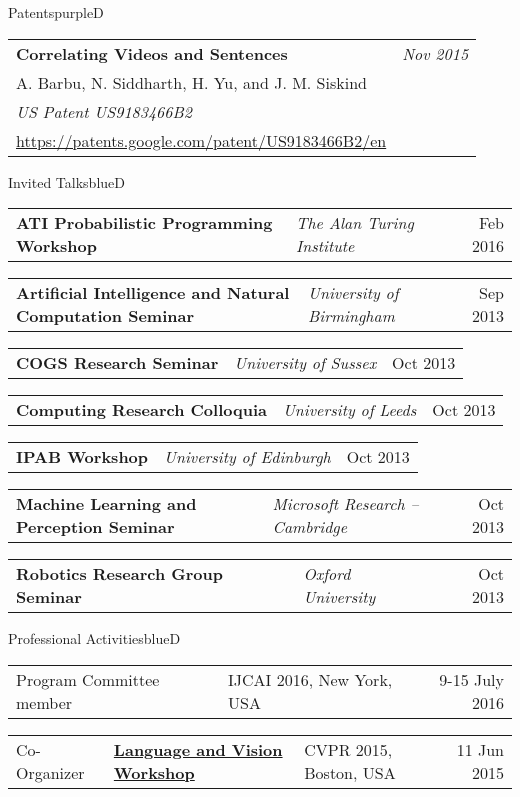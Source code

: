 \documentclass[a4paper]{article}
\makeatletter
\newlength{\itemtextwidth}
\newenvironment{publication}[5]
{ \item
  \begin{tabular*}{\itemtextwidth}{@{}p{5.6in}@{\extracolsep{\fill}}r@{}}
    \textbf{#1} & \textit{#2}\\ #3 &\\ \textit{#4}&\\ #5
  \end{tabular*}
  \vspace*{-2pt}
} {}
\newenvironment{talk}[3]
{ \item
  \begin{tabular*}{\itemtextwidth}{@{}l@{\hspace*{2ex}}l@{\extracolsep{\fill}}r@{}}
    \textbf{#1} & \textit{#2} & #3
  \end{tabular*}
  \vspace*{-2pt}
} {}
\newenvironment{workshop}[5]
{ \item
  \begin{tabular*}{\itemtextwidth}{@{}ll@{\hspace*{1ex}}l@{\extracolsep{\fill}}r@{}}
    #1 & \href{#3}{\textbf{#2}} & {\small #4} & #5
  \end{tabular*}
  \vspace*{-2pt}
} {}
\def\item{\addtocounter{enumi}{-2}\oldItem}
\makeatother
\begin{document}
\begin{region}[P][1]{Patents}{purpleD}
  \begin{publication} {Correlating Videos and Sentences}
    {Nov 2015}                  %
    {A. Barbu, N. Siddharth, H. Yu, and J. M. Siskind}
    {US Patent US9183466B2}
    {\url{https://patents.google.com/patent/US9183466B2/en}}
  \end{publication}
\end{region}

\begin{region}{Invited Talks}{blueD}
  \begin{talk} {ATI Probabilistic Programming Workshop}
    {The Alan Turing Institute}
    {Feb 2016}
  \end{talk}
  \begin{talk} {Artificial Intelligence and Natural Computation Seminar}
    {University of Birmingham}
    {Sep 2013}
  \end{talk}
  \begin{talk}{COGS Research Seminar}
    {University of Sussex}
    {Oct 2013}
  \end{talk}
  \begin{talk} {Computing Research Colloquia}
    {University of Leeds}
    {Oct 2013}
  \end{talk}
  \begin{talk} {IPAB Workshop}
    {University of Edinburgh}
    {Oct 2013}
  \end{talk}
  \begin{talk} {Machine Learning and Perception Seminar}
    {Microsoft Research -- Cambridge}
    {Oct 2013}
  \end{talk}
  \begin{talk} {Robotics Research Group Seminar}
    {Oxford University}
    {Oct 2013}
  \end{talk}
\end{region}

\begin{region}{Professional Activities}{blueD}
  \begin{workshop} {Program Committee member}
    {}
    {}
    {IJCAI 2016, New York, USA}
    {9-15 July 2016}
  \end{workshop}
  \begin{workshop} {Co-Organizer}
    {Language and Vision Workshop}
    {www.languageandvision.com}
    {CVPR 2015, Boston, USA}
    {11 Jun 2015}
  \end{workshop}
\end{region}
\end{document}

